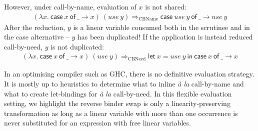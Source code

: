 \documentclass[acmsmall,review,screen]{acmart}
\newcommand{\llet}[2]{\mathsf{let}~#1~\mathsf{in}~#2}
\newcommand{\ccase}[2]{\mathsf{case}~#1~\mathsf{of}~#2}
\begin{document}
However, under call-by-name, evaluation of $x$ is not shared:
\[
\begin{array}{l}
(\lambda x.~\ccase{x}{\_ \to x})~(use~y)
\Longrightarrow_\textrm{CBName}
\ccase{use~y}{\_ \to use~y}
\end{array}
\]
After the reduction, $y$ is a linear variable consumed both in the scrutinee
and in the case alternative -- $y$ has been duplicated!
%
If the application is instead reduced call-by-need, $y$ is not duplicated:
\[
\begin{array}{l}
(\lambda x.~\ccase{x}{\_ \to x})~(use~y)
\Longrightarrow_\textrm{CBNeed}
\llet{x = use~y}{\ccase{x}{\_ \to x}}
\end{array}
\]

In an optimising compiler such as GHC, there is no definitive evaluation
strategy. It is mostly up to heuristics to determine what to inline
\emph{à la} call-by-name and what to create let-bindings for \emph{à
la} call-by-need.
%
In this flexible evaluation setting, we highlight the reverse binder swap is
only a linearity-preserving transformation as long as a linear variable with
more than one occurrence is never substituted for an expression with free
linear variables.
%
%

%
%
%
%
\end{document}

